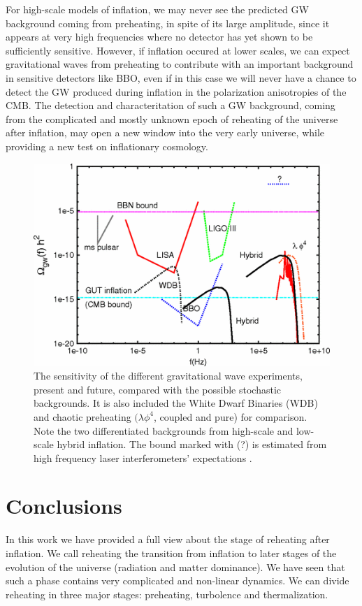 \documentclass[11pt,a4paper,twoside]{book}
\begin{document}
For high-scale models of inflation, we may never  see the predicted GW background coming from preheating, in spite of its large amplitude, since it appears at very high frequencies where no detector has yet shown to be sufficiently sensitive. However, if inflation occured at lower scales, we can expect gravitational waves from preheating to contribute with an important background in sensitive detectors like BBO, even if in this case we will never have a chance to detect the GW produced during inflation in the polarization anisotropies of the CMB. The detection  and characteritation of such a GW background, coming from the complicated and mostly unknown epoch of reheating of the universe after inflation, may open a new window into the very early universe, while providing a new test on inflationary cosmology.

\begin{figure}
	\centering
	\includegraphics[width=0.8\linewidth, height=0.4\textheight]{Images/Chap7/Hybrid_Fig10}
	\caption{The sensitivity of the different gravitational wave experiments, present and future, compared with the possible stochastic backgrounds. It is also included the White Dwarf Binaries (WDB) and chaotic preheating $ (\lambda \phi^{4} $, coupled and pure) for comparison. Note the two differentiated backgrounds from high-scale and low-scale hybrid inflation. The bound marked with (?) is estimated from high frequency laser interferometers' expectations \cite{Chap7:HybridModel}.}
	\label{fig:hybridfig10}
\end{figure}



\chapter*{Conclusions}
In  this work we have provided a full view about the stage of reheating after inflation. We call reheating the transition from inflation to later stages of the evolution of the universe (radiation and matter dominance). We have seen that such a phase contains  very complicated and non-linear dynamics.  We can divide reheating in three major stages: preheating, turbolence and thermalization.
\end{document}
